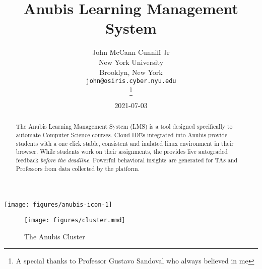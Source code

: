 \documentclass[12pt]{report}
\title{Anubis Learning Management System}
\date{2021-07-03}
\author{%
    John McCann Cunniff Jr \\
    New York University\\
    Brooklyn, New York \\
    \texttt{john@osiris.cyber.nyu.edu} \\
    \thanks{A special thanks to Professor Gustavo Sandoval who always believed in me} \\
}
\begin{document}
    \begin{titlepage}

        \maketitle

        \vspace{0.3cm}
        \begin{center}
            \texttt{[image: figures/anubis-icon-1]}
        \end{center}
        \vspace{0.3cm}

        \begin{abstract}
            The Anubis Learning Management System (LMS) is a tool designed specifically to automate Computer Science courses. 
            Cloud IDEs integrated into Anubis provide students with a one click stable, consistent and inulated linux environment
            in their browser.
            While students work on their assignments, the provides live autograded feedback \textit{before the deadline}.
            Powerful behavioral insights are generated for TAs and Professors from data collected by the platform.
        \end{abstract}


    \end{titlepage}

    \tableofcontents

    \pagebreak

    \begin{figure}[h]
        \centering
        \texttt{[image: figures/cluster.mmd]}
        \caption{The Anubis Cluster\label{fig:cluster}}
    \end{figure}


    

    

    

    

    

    
\end{document}
